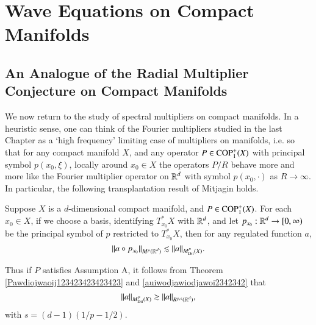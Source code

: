 \chapter{Wave Equations on Compact Manifolds} \label{chap:waveequation}

\section{An Analogue of the Radial Multiplier Conjecture on Compact Manifolds} \label{sec:AnAnalogueOf}

We now return to the study of spectral multipliers on compact manifolds. In a heuristic sense, one can think of the Fourier multipliers studied in the last Chapter as a `high frequency' limiting case of multipliers on manifolds, i.e. so that for any compact manifold $X$, and any operator $P \in {\text{COP}^{+}_{{1}}}(X)$ with principal symbol $p(x_0,\xi)$, locally around $x_0 \in X$ the operators $P/R$ behave more and more like the Fourier multiplier operator on $\operatorname{\mathbb{R}}^d$ with symbol $p(x_0,\cdot)$ as $R \to \infty$. In particular, the following transplantation result of Mitjagin \cite{Mitjagin} holds.

\begin{theorem} \label{Pawdiojwaoij123423423423423}
  Suppose $X$ is a $d$-dimensional compact manifold, and $P \in {\text{COP}^{+}_{{1}}}(X)$. For each $x_0 \in X$, if we choose a basis, identifying $T_{x_0}^* X$ with $\operatorname{\mathbb{R}}^d$, and let $p_{x_0}: \operatorname{\mathbb{R}}^d \to [0,\infty)$ be the principal symbol of $p$ restricted to $T_{x_0}^* X$, then for any regulated function $a$,
  \[ \| a \circ p_{x_0} \|_{M^p(\operatorname{\mathbb{R}}^d)} \lesssim \| a \|_{M^p_{\text{Dil}}(X)}. \]
\end{theorem}

Thus if $P$ satisfies Assumption A, it follows from Theorem \ref{Pawdiojwaoij123423423423423} and \eqref{auiwodjawiodjawoi2342342} that
%
\begin{equation} \label{upperboundawdoiwjdoawi}
  \| a \|_{M^p_{\text{Dil}}(X)} \gtrsim \| a \|_{R^{p,s}(\operatorname{\mathbb{R}}^d)},
\end{equation}
%
with $s = (d-1)(1/p - 1/2)$.

